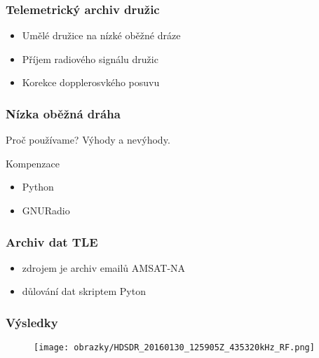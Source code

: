 \documentclass[%
  12pt,               %
  t,                  %
  aspectratio=1610,   %
  unicode,            %
czech,              %
]{beamer}              %
\begin{document}
\vypninavigacnisymboly

\vytvortitulku

\begin{frame}
  \frametitle{Telemetrický archiv družic}
  \begin{itemize}
    \item Umělé družice na nízké oběžné dráze
    \item Příjem radiového signálu družic
    \item Korekce dopplerosvkého posuvu
  \end{itemize}
\end{frame}

\begin{frame}
  \frametitle{Nízka oběžná dráha}



  \begin{block}{Proč používame?}
    Výhody a nevýhody.
  \end{block}

  \begin{alertblock}{Kompenzace}
    \begin{itemize}
      \item Python
      \item GNURadio
    \end{itemize}
  \end{alertblock}
\end{frame}


\begin{frame}
  \frametitle{Archiv dat TLE}
    \begin{itemize}
      \item zdrojem je archiv emailů AMSAT-NA
      \item důlování dat skriptem Pyton
    \end{itemize}
\end{frame}


\begin{frame}
  \frametitle{Výsledky}
    \begin{figure}[ht]
      \centering
      \texttt{[image: obrazky/HDSDR\_20160130\_125905Z\_435320kHz\_RF.png]}
    \end{figure}
\end{frame}
\end{document}
